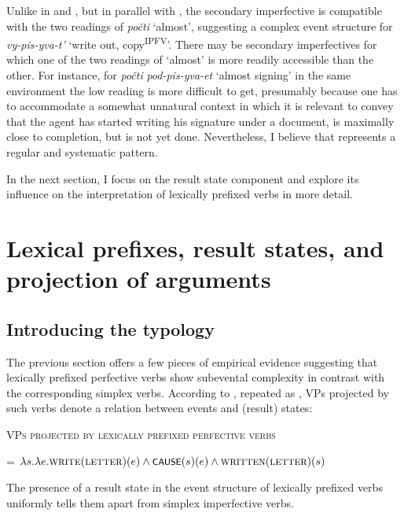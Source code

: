 \documentclass[output=paper,colorlinks,citecolor=brown]{langscibook}
\begin{document}
{\noindent Unlike in  and , but in parallel with , the secondary imperfective is compatible with the two readings of \textit{počti} ‘almost’, suggesting a complex event structure for \textit{vy-pis-yva-t’} ‘write out, copy\textsuperscript{IPFV}’. There may be secondary imperfectives for which one of the two readings of ‘almost’ is more readily accessible than the other. For instance, for \textit{počti} \textit{pod-pis-yva-et} ‘almost signing’ in the same environment the low reading is more difficult to get, presumably because one has to accommodate a somewhat unnatural context in which it is relevant to convey that the agent has started writing his %
signature under a document, is maximally close to completion, but is not yet done. Nevertheless, I believe that  represents a regular and systematic pattern.}

In the next section, I focus on the result state component and explore its influence on the interpretation of lexically prefixed verbs in more detail. 

\section{Lexical prefixes, result states, and projection of arguments}\label{tat:sec:3}
\hypertarget{RefHeadingToc164647624}{}\subsection{Introducing the typology}\label{sec:3.1}
\hypertarget{RefHeadingToc164647625}{}
The previous section offers a few pieces of empirical evidence suggesting that lexically prefixed perfective verbs show subevental complexity in contrast with the corresponding simplex verbs. According to , repeated as , VPs projected by such verbs denote a relation between events and (result) states:

\ea   \textsc{VPs projected by lexically prefixed perfective verbs}\label{tat:ex:62}

   = $\lambda s.\lambda e. \textsc{write}(\textsc{letter})(e) \wedge \cnst{cause}(s)(e) \wedge \textsc{written}(\textsc{letter})(s)$ 
\z

\noindent The presence of a result state in the event structure of lexically prefixed verbs uniformly tells them apart from simplex imperfective verbs. 
\end{document}
